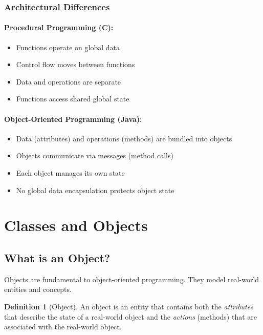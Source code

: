 \documentclass[11pt, a4paper, notitlepage]{report}
\theoremstyle{definition}
\newtheorem{definition}[theorem]{Definition}
\theoremstyle{remark}
\theoremstyle{definition}
\begin{document}
\subsubsection{Architectural Differences}

\paragraph{Procedural Programming (C):}
\begin{itemize}
  \item Functions operate on global data
  \item Control flow moves between functions
  \item Data and operations are separate
  \item Functions access shared global state
\end{itemize}

\paragraph{Object-Oriented Programming (Java):}
\begin{itemize}
  \item Data (attributes) and operations (methods) are bundled into objects
  \item Objects communicate via messages (method calls)
  \item Each object manages its own state
  \item No global data  encapsulation protects object state
\end{itemize}

\section{Classes and Objects}
\label{sec:ch1-classes-objects}

\subsection{What is an Object?}

Objects are fundamental to object-oriented programming. They model real-world entities and concepts.

\begin{definition}[Object]
\label{def:ch1-object}
An object is an entity that contains both the \emph{attributes} that describe the state of a real-world object and the \emph{actions} (methods) that are associated with the real-world object.
\end{definition}
\end{document}
